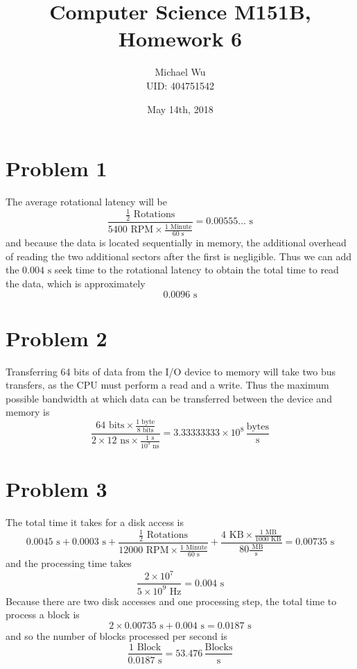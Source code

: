 \documentclass[12pt]{article}
\begin{document}
\title{Computer Science M151B, Homework 6}
\date{May 14th, 2018}
\author{Michael Wu\\UID: 404751542}
\maketitle

\section*{Problem 1}

The average rotational latency will be
\[\frac{\frac{1}{2}\text{ Rotations}}{5400\text{ RPM}\times \frac{1 \text{ Minute}}{60 \text{ s}}}=0.00555\ldots \text{ s}\]
and because the data is located sequentially in memory, the additional overhead of reading the two additional sectors after the first is negligible.
Thus we can add the \(0.004 \text{ s}\) seek time to the rotational latency to obtain the total time to read the data, which is approximately
\[0.0096\text{ s}\]

\section*{Problem 2}

Transferring 64 bits of data from the I/O device to memory will take two bus transfers, as the CPU must perform a read and a write. Thus
the maximum possible bandwidth at which data can be transferred between the device and memory is
\[\frac{64 \text{ bits} \times \frac{1 \text{ byte}}{8 \text{ bits}}}{2\times 12 \text{ ns} \times \frac{1 \text{ s}}{10^9 \text{ ns}}}
=3.33333333 \times 10^8 \,\frac{\text{bytes}}{\text{s}}\]

\section*{Problem 3}

The total time it takes for a disk access is
\[0.0045 \text{ s}
+0.0003 \text{ s}
+\frac{\frac{1}{2}\text{ Rotations}}{12000\text{ RPM}\times \frac{1 \text{ Minute}}{60 \text{ s}}}
+\frac{4 \text{ KB}\times \frac{1\text{ MB}}{1000 \text{ KB}}}{80 \frac{\text{ MB}}{\text{s}}}
=0.00735 \text{ s}\]
and the processing time takes
\[\frac{2\times 10^7}{5\times 10^9 \text{ Hz}}=0.004 \text{ s}\]
Because there are two disk accesses and one processing step, the total time to process a block is
\[2\times 0.00735 \text{ s} + 0.004 \text{ s} = 0.0187 \text{ s}\]
and so the number of blocks processed per second is
\[\frac{1 \text{ Block}}{0.0187 \text{ s}}=53.476 \,\frac{\text{Blocks}}{\text{s}}\]
\end{document}

